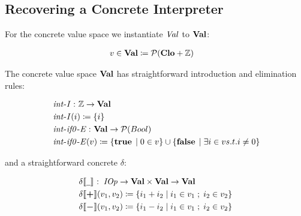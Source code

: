 \par

\subsection{Recovering a Concrete
Interpreter}\label{recovering-a-concrete-interpreter}

\par

For the concrete value space we instantiate $ \operatorname{\mathit{Val}} $ to
$ \mathtt{\mathbf{Val}} $:

\small\begin{align*}
&\hspace{0em} v  \in   \mathtt{\mathbf{Val}}   \coloneqq   \mathcal{P}  (\mathtt{\mathbf{Clo}}  +  \mathbb{Z} )
\end{align*}\normalsize

The concrete value space $ \mathtt{\mathbf{Val}} $ has straightforward
introduction and elimination rules:

\small\begin{align*}
&\hspace{0em}  \operatorname{\mathit{int-I}}   \mathbin{\colon}   \mathbb{Z}   \rightarrow   \mathtt{\mathbf{Val}}  \\
&\hspace{0em}  \operatorname{\mathit{int-I}}( i)  \coloneqq   \{ i \}  \\
&\hspace{0em}  \operatorname{\mathit{int-if0-E}}   \mathbin{\colon}   \mathtt{\mathbf{Val}}   \rightarrow   \mathcal{P} (Bool) \\
&\hspace{0em}  \operatorname{\mathit{int-if0-E}}( v)  \coloneqq   \{   \operatorname{\mathtt{\boldsymbol{\mathbf{true}}}}   \;|\;  0  \in  v  \}   \cup   \{   \operatorname{\mathtt{\boldsymbol{\mathbf{false}}}}   \;|\;   \exists  i  \in  v s.t. i  \neq  0  \} 
\end{align*}\normalsize

and a straightforward concrete $ \delta $:

\small\begin{align*}
&\hspace{0em}  \delta  \llbracket  \underline{\hspace{0.5em}}  \rrbracket   \mathbin{\colon}   \operatorname{\mathit{IOp}}   \rightarrow   \mathtt{\mathbf{Val}}   \times   \mathtt{\mathbf{Val}}   \rightarrow   \mathtt{\mathbf{Val}}  \\
&\hspace{0em}  \delta  \llbracket  \mathbin{\mathtt{\mathbf{\boldsymbol{+}}}}  \rrbracket (v _1 ,v _2 )  \coloneqq   \{  i _1  + i _2   \;|\;  i _1   \in  v _1   \;;\;  i _2   \in  v _2   \}  \\
&\hspace{0em}  \delta  \llbracket  \mathbin{\mathtt{\mathbf{\boldsymbol{-}}}}  \rrbracket (v _1 ,v _2 )  \coloneqq   \{  i _1  - i _2   \;|\;  i _1   \in  v _1   \;;\;  i _2   \in  v _2   \} 
\end{align*}\normalsize

